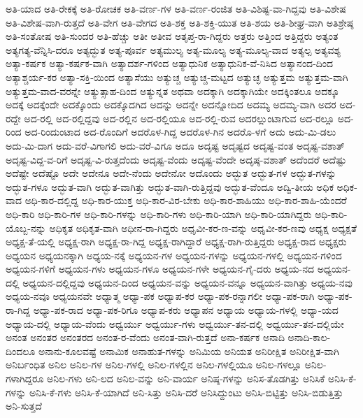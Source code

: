{ಅತಿ-ಯಾದ
ಅತಿ-ರೇಕಕ್ಕೆ
ಅತಿ-ರೋಚಕ
ಅತಿ-ವರ್ಣ-ಗಳ
ಅತಿ-ವರ್ಣ-ರಂಜಿತ
ಅತಿ-ವಿಶಿಷ್ಟ-ವಾ-ಗಿದ್ದವು
ಅತಿ-ವಿಶೇಷ
ಅತಿ-ವಿಶೇಷ-ವಾಗಿ-ರುತ್ತದೆ
ಅತಿ-ವೇಗ
ಅತಿ-ವೇಗದ
ಅತಿ-ಶಕ್ತ
ಅತಿ-ಶಕ್ತಿ-ಯುತ
ಅತಿ-ಶಯ
ಅತಿ-ಶೀಘ್ರ-ವಾಗಿ
ಅತಿಶ್ರೇಷ್ಠ
ಅತಿ-ಸಂತೋಷ
ಅತಿ-ಸುಂದರ
ಅತಿ-ಹೆಚ್ಚು
ಅತೀ
ಅತೀವ
ಅತೃಪ್ತ-ರಾ-ಗಿದ್ದರು
ಅತ್ತರು
ಅತ್ತಿಂದ
ಅತ್ತಿದ್ದರು
ಅತ್ಯಂತ
ಅತ್ಯಗತ್ಯ-ವೆನ್ನಿಸಿ-ದರೂ
ಅತ್ಯದ್ಭುತ
ಅತ್ಯ-ಪೂರ್ವ
ಅತ್ಯಮುಲ್ಯ
ಅತ್ಯ-ಮೂಲ್ಯ
ಅತ್ಯ-ಮೂಲ್ಯ-ವಾದ
ಅತ್ಯಲ್ಪ
ಅತ್ಯವಶ್ಯ
ಅತ್ಯಾ-ಕರ್ಷಕ
ಅತ್ಯಾ-ಕರ್ಷಕ-ವಾಗಿ
ಅತ್ಯಾದರ್ಶ-ಗಳಿಂದ
ಅತ್ಯಾಧುನಿಕ
ಅತ್ಯಾಧುನಿಕ-ವೆ-ನಿಸಿದ
ಅತ್ಯಾನಂದ-ದಿಂದ
ಅತ್ಯಾಶ್ಚರ್ಯ-ಕರ
ಅತ್ಯಾ-ಸಕ್ತಿ-ಯಿಂದ
ಅತ್ಯಾಸೆಯು
ಅತ್ಯುಚ್ಚ
ಅತ್ಯುಚ್ಚ-ಮಟ್ಟದ
ಅತ್ಯುಚ್ಛ
ಅತ್ಯುತ್ತಮ
ಅತ್ಯುತ್ತಮ-ವಾಗಿ
ಅತ್ಯುತ್ತಮ-ವಾದ-ವರನ್ನೇ
ಅತ್ಯುತ್ಸಾಹ-ದಿಂದ
ಅತ್ಯುನ್ನತ
ಅಥವಾ
ಅದಕ್ಕಾಗಿ
ಅದಕ್ಕಾಗಿಯೇ
ಅದಕ್ಕಿಂತಲೂ
ಅದಕ್ಕೂ
ಅದಕ್ಕೆ
ಅದಕ್ಕೆಂದೇ
ಅದಕ್ಕೊಂದು
ಅದಕ್ಕೊದಗಿದ
ಅದನ್ನು
ಅದನ್ನೇ
ಅದನ್ನೋದಿದ
ಅದಮ್ಯ
ಅದಮ್ಯ-ವಾಗಿ
ಅದರ
ಅದ-ರದ್ದೇ
ಅದ-ರಲ್ಲಿ
ಅದ-ರಲ್ಲಿದ್ದವು
ಅದ-ರಲ್ಲಿನ
ಅದ-ರಲ್ಲಿಯೂ
ಅದ-ರಲ್ಲಿ-ರುವ
ಅದರಲ್ಲುಂಟಾಗುವ
ಅದ-ರಲ್ಲೂ
ಅದ-ರಿಂದ
ಅದ-ರಿಂದುಂಟಾದ
ಅದ-ರೊಂದಿಗೆ
ಅದರೊಳ-ಗಿದ್ದ
ಅದರೊಳ-ಗಿನ
ಅದರೊ-ಳಗೆ
ಅದು
ಅದು-ಮಿ-ಡಲು
ಅದು-ಮಿ-ದಾಗ
ಅದು-ವರೆ-ವಿಗಾಗಲಿ
ಅದು-ವರೆ-ವಿಗೂ
ಅದೂ
ಅದೃಷ್ಟ
ಅದೃಷ್ಟದ
ಅದೃಷ್ಟ-ವಂತ
ಅದೃಷ್ಟ-ವಶಾತ್
ಅದೃಷ್ಟ-ವಿದ್ದ-ವ-ರಿಗೆ
ಅದೃಷ್ಟ-ವಿ-ರುತ್ತದೆಂದು
ಅದೃಷ್ಟ-ವೆಂದು
ಅದೃಷ್ಟ-ವೆಂದೇ
ಅದೃಷ್ಠ-ವಶಾತ್
ಅದೆಂದರೆ
ಅದೆಷ್ಟು
ಅದೆಷ್ಟೇ
ಅದೆಷ್ಟೊ
ಅದೇ
ಅದೇನೂ
ಅದೇ-ನೆಂದು
ಅದೇನೋ
ಅದೊಂದು
ಅದ್ಭುತ
ಅದ್ಭುತ-ಗಳ
ಅದ್ಭುತ-ಗಳನ್ನು
ಅದ್ಭುತ-ಗಳೂ
ಅದ್ಭುತ-ವಾಗಿ
ಅದ್ಭುತ-ವಾಗಿತ್ತು
ಅದ್ಭುತ-ವಾಗಿ-ರುತ್ತಿದ್ದವು
ಅದ್ಭುತ-ವೆಂದೂ
ಅದ್ವಿ-ತೀಯ
ಅಧಿಕ
ಅಧಿಕ-ವಾದ
ಅಧಿ-ಕಾರ-ದಲ್ಲಿದ್ದ
ಅಧಿ-ಕಾರ-ಯುಕ್ತ
ಅಧಿ-ಕಾರ-ವಿರ-ಬೇಕು
ಅಧಿ-ಕಾರ-ಶಾಹಿಯು
ಅಧಿ-ಕಾರ-ಶಾಹಿ-ಯೆಂದರೆ
ಅಧಿ-ಕಾರಿ
ಅಧಿ-ಕಾರಿ-ಗಳ
ಅಧಿ-ಕಾರಿ-ಗಳನ್ನು
ಅಧಿ-ಕಾರಿ-ಗಳು
ಅಧಿ-ಕಾರಿ-ಯಾಗಿ
ಅಧಿ-ಕಾರಿ-ಯಾಗಿದ್ದರು
ಅಧಿ-ಕಾರಿ-ಯೊಬ್ಬ-ನನ್ನು
ಅಧಿಕೃತ
ಅಧಿಕೃತ-ವಾಗಿ
ಅಧೀನ-ರಾ-ಗಿದ್ದರು
ಅಧೃವೀ-ಕರ-ಣ-ವನ್ನು
ಅಧೃವೀ-ಕರ-ಣವು
ಅಧ್ಯಕ್ಷ
ಅಧ್ಯಕ್ಷತೆ
ಅಧ್ಯಕ್ಷ-ತೆ-ಯಲ್ಲಿ
ಅಧ್ಯಕ್ಷ-ರಾಗಿ
ಅಧ್ಯಕ್ಷ-ರಾ-ಗಿದ್ದ
ಅಧ್ಯಕ್ಷ-ರಾಗಿದ್ದಾರೆ
ಅಧ್ಯಕ್ಷ-ರಾಗಿ-ರುತ್ತಿದ್ದರು
ಅಧ್ಯಕ್ಷ-ರಾದ
ಅಧ್ಯಕ್ಷರು
ಅಧ್ಯಯನ
ಅಧ್ಯಯನಕ್ಕಾಗಿ
ಅಧ್ಯಯ-ನಕ್ಕೆ
ಅಧ್ಯಯನ-ಗಳ
ಅಧ್ಯಯನ-ಗಳನ್ನು
ಅಧ್ಯಯನ-ಗಳಲ್ಲಿ
ಅಧ್ಯಯನ-ಗಳಿಂದ
ಅಧ್ಯಯನ-ಗಳಿಗೆ
ಅಧ್ಯಯನ-ಗಳು
ಅಧ್ಯಯನ-ಗಳೂ
ಅಧ್ಯಯನ-ಗಳೇ
ಅಧ್ಯಯನ-ಗೈ-ದರು
ಅಧ್ಯಯ-ನದ
ಅಧ್ಯಯನ-ದಲ್ಲಿ
ಅಧ್ಯಯನ-ದಲ್ಲಿದ್ದವು
ಅಧ್ಯಯನ-ದಿಂದ
ಅಧ್ಯಯನ-ವನ್ನು
ಅಧ್ಯಯನ-ವನ್ನೂ
ಅಧ್ಯಯನ-ವಾಗಿತ್ತು
ಅಧ್ಯಯ-ನವು
ಅಧ್ಯಯ-ನವೂ
ಅಧ್ಯಯನವೇ
ಅಧ್ಯಾತ್ಮ
ಅಧ್ಯಾ-ಪಕ
ಅಧ್ಯಾಪ-ಕರ
ಅಧ್ಯಾ-ಪಕ-ರನ್ನಾಗಲೀ
ಅಧ್ಯಾ-ಪಕ-ರಾಗಿ
ಅಧ್ಯಾ-ಪಕ-ರಾ-ಗಿದ್ದ
ಅಧ್ಯಾ-ಪಕ-ರಾದ
ಅಧ್ಯಾ-ಪಕ-ರಿಗೂ
ಅಧ್ಯಾಪ-ಕರು
ಅಧ್ಯಾಪನ
ಅಧ್ಯಾಯ
ಅಧ್ಯಾಯ-ಗಳಲ್ಲಿ
ಅಧ್ಯಾ-ಯದ
ಅಧ್ಯಾಯ-ದಲ್ಲಿ
ಅಧ್ಯಾಯ-ವೆಂದು
ಅಧ್ವರ್ಯು
ಅಧ್ವರ್ಯು-ಗಳು
ಅಧ್ವರ್ಯು-ತನ-ದಲ್ಲಿ
ಅಧ್ವರ್ಯು-ತನ-ದಲ್ಲಿಯೇ
ಅನಂತ
ಅನಂತರ
ಅನಂತರದ
ಅನಂತ-ರ-ವೆಂದು
ಅನಂತ-ವಾಗಿ-ರುತ್ತದೆ
ಅನಾ-ಕರ್ಷಕ
ಅನಾದಿ
ಅನಾದಿ-ಕಾಲ-ದಿಂದಲೂ
ಅನಾನು-ಕೂಲವಷ್ಟೆ
ಅನಾಮಿಕ
ಅನಾಹುತ-ಗಳನ್ನು
ಅನಿಮಿಯ
ಅನಿಯತ
ಅನಿರೀಕ್ಷಿತ
ಅನಿರೀಕ್ಷಿತ-ವಾಗಿ
ಅನಿರ್ಬಂಧಿತ
ಅನಿಲ
ಅನಿಲ-ಗಳ
ಅನಿಲ-ಗಳಲ್ಲಿ
ಅನಿಲ-ಗಳಲ್ಲಿನ
ಅನಿಲ-ಗಳಲ್ಲಿಯೂ
ಅನಿಲ-ಗಳಲ್ಲೂ
ಅನಿಲ-ಗಳಾಗಿದ್ದರೂ
ಅನಿಲ-ಗಳು
ಅನಿ-ಲದ
ಅನಿಲ-ವನ್ನು
ಅನಿ-ವಾರ್ಯ
ಅನಿಷ್ಠ-ಗಳನ್ನು
ಅನಿಸ-ತೊಡಗಿತ್ತು
ಅನಿಸಿಕೆ
ಅನಿಸಿ-ಕೆ-ಗಳನ್ನು
ಅನಿಸಿ-ಕೆ-ಗಳು
ಅನಿಸಿ-ಕೆ-ಯಾಗಿದೆ
ಅನಿ-ಸಿತ್ತು
ಅನಿಸಿ-ದರೆ
ಅನಿಸಿದ್ದುಂಟು
ಅನಿಸಿ-ಬಿಟ್ಟಿತ್ತು
ಅನಿಸಿ-ಬಿಡುತ್ತಿತ್ತು
ಅನಿ-ಸುತ್ತದೆ
}
